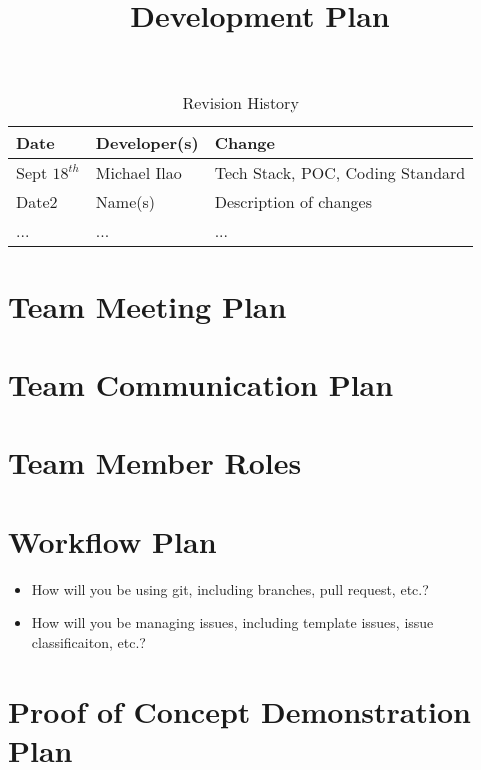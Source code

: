 \documentclass{article}
\title{Development Plan\\\progname}
\author{\authname}
\date{}
\begin{document}
\begin{table}[hp]
\caption{Revision History} \label{TblRevisionHistory}
\begin{tabularx}{\textwidth}{llX}
\toprule
\textbf{Date} & \textbf{Developer(s)} & \textbf{Change}\\
\midrule
Sept $18^{th}$ & Michael Ilao & Tech Stack, POC, Coding Standard\\
Date2 & Name(s) & Description of changes\\
... & ... & ...\\
\bottomrule
\end{tabularx}
\end{table}

\newpage

\maketitle


\section{Team Meeting Plan}

\section{Team Communication Plan}

\section{Team Member Roles}

\section{Workflow Plan}

\begin{itemize}
	\item How will you be using git, including branches, pull request, etc.?
	\item How will you be managing issues, including template issues, issue
	classificaiton, etc.?
\end{itemize}

\section{Proof of Concept Demonstration Plan}
\end{document}
